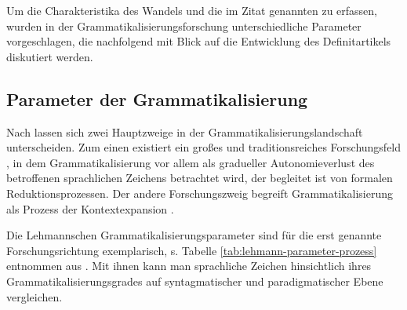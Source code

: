 \noindent 
Um die Charakteristika des Wandels und die im Zitat genannten  zu erfassen, wurden in der Grammatikalisierungsforschung unterschiedliche Parameter vorgeschlagen, die nachfolgend mit Blick auf die Entwicklung des Definitartikels diskutiert werden.   


\subsection{Parameter der Grammatikalisierung}\label{sec:parameter}

Nach \textcite[96ff.]{Traugott2013} lassen sich zwei Hauptzweige in der Grammatikalisierungslandschaft unterscheiden. Zum einen existiert ein großes und traditionsreiches Forschungsfeld \parencite[hierzu zählen u.a. die Arbeiten von][]{Givon1979,Haspelmath2004,Lehmann2015,}, in dem Grammatikalisierung vor allem als gradueller Autonomieverlust des betroffenen sprachlichen Zeichens betrachtet wird, der begleitet ist von formalen Reduktionsprozessen. Der andere Forschungszweig begreift Grammatikalisierung als Prozess der Kontextexpansion \parencite{Himmelmann1997,Himmelmann2004}. 

Die Lehmannschen Grammatikalisierungsparameter sind für die erst genannte  Forschungsrichtung exemplarisch, s. Tabelle \ref{tab:lehmann-parameter-prozess} entnommen aus \textcite{Lehmann1995}. Mit ihnen kann man sprachliche Zeichen hinsichtlich ihres Grammatikalisierungsgrades auf syntagmatischer und paradigmatischer Ebene vergleichen. 


